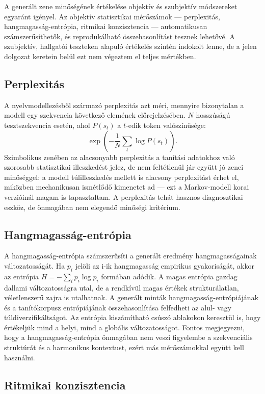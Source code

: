 A generált zene minőségének értékelése objektív és szubjektív módszereket egyaránt igényel. Az objektív statisztikai mérőszámok --- perplexitás, hangmagasság-entrópia, ritmikai konzisztencia --- automatikusan számszerűsíthetők, és reprodukálható összehasonlítást tesznek lehetővé. A szubjektív, hallgatói teszteken alapuló értékelés szintén indokolt lenne, de a jelen dolgozat keretein belül ezt nem végeztem el teljes mértékben.

\subsection{Perplexitás}

A nyelvmodellezésből származó perplexitás azt méri, mennyire bizonytalan a modell egy szekvencia következő elemének előrejelzésében. $N$ hosszúságú tesztszekvencia esetén, ahol $P(s_t)$ a $t$-edik token valószínűsége:
\[
\exp\!\left(-\frac{1}{N} \sum_t \log P(s_t)\right).
\]
Szimbolikus zenében az alacsonyabb perplexitás a tanítási adatokhoz való szorosabb statisztikai illeszkedést jelez, de nem feltétlenül jár együtt jó zenei minőséggel: a modell túlilleszkedés mellett is alacsony perplexitást érhet el, miközben mechanikusan ismétlődő kimenetet ad --- ezt a Markov-modell korai verzióinál magam is tapasztaltam. A perplexitás tehát hasznos diagnosztikai eszköz, de önmagában nem elegendő minőségi kritérium.

\subsection{Hangmagasság-entrópia}

A hangmagasság-entrópia számszerűsíti a generált eredmény hangmagasságainak változatosságát. Ha $p_i$ jelöli az i-ik hangmagasság empirikus gyakoriságát, akkor az entrópia 
$H = -\sum_i p_i \log p_i$
formában adódik. A magas entrópia gazdag dallami változatosságra utal, de a rendkívül magas értékek strukturálatlan, véletlenszerű zajra is utalhatnak. A generált minták hangmagasság-entrópiájának és a tanítókorpusz entrópiájának összehasonlítása felfedheti az alul- vagy túldiverzifikáltságot. Az entrópia kiszámítható csúszó ablakokon keresztül is, hogy értékeljük mind a helyi, mind a globális változatosságot. Fontos megjegyezni, hogy a hangmagasság-entrópia önmagában nem veszi figyelembe a szekvenciális struktúrát és a harmonikus kontextust, ezért más mérőszámokkal együtt kell használni.

\subsection{Ritmikai konzisztencia}

